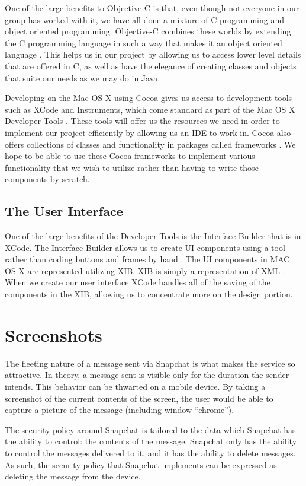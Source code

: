 \documentclass[11pt, a4paper,titlepage]{report}
\begin{document}
One of the large benefits to Objective-C is that, even though not everyone in our group has worked with it, we have all done a mixture of C programming and object oriented programming. Objective-C combines these worlds by extending the C programming language in such a way that makes it an object oriented language \cite{Hillegass}. This helps us in our project by allowing us to access lower level details that are offered in C, as well as have the elegance of creating classes and objects that suite our needs as we may do in Java.

Developing on the Mac OS X using Cocoa gives us access to development tools such as XCode and Instruments, which come standard as part of the Mac OS X Developer Tools \cite{Hillegass}. These tools will offer us the resources we need in order to implement our project  efficiently by allowing us an IDE to work in. Cocoa also offers collections of classes and functionality in packages called frameworks \cite{Hillegass}. We hope to be able to use these Cocoa frameworks to implement various functionality that we wish to utilize rather than having to write those components by scratch.

\subsection*{The User Interface}
One of the large benefits of the Developer Tools is the Interface Builder that is in XCode. The Interface Builder allows us to create UI components using a tool rather than coding buttons and frames by hand \cite{Hillegass}. The UI components in MAC OS X are represented utilizing XIB. XIB is simply a representation of XML \cite{Hillegass}. When we create our user interface XCode handles all of the saving of the components in the XIB, allowing us to concentrate more on the design portion.

\section*{Screenshots}
The fleeting nature of a message sent via Snapchat is what makes the service so attractive. In theory, a message sent is visible only for the duration the sender intends. This behavior can be thwarted on a mobile device. By taking a screenshot of the current contents of the screen, the user would be able to capture a picture of the message (including window ``chrome'').

The security policy around Snapchat is tailored to the data which Snapchat has the ability to control: the contents of the message. Snapchat only has the ability to control the messages delivered to it, and it has the ability to delete messages. As such, the security policy that Snapchat implements can be expressed as deleting the message from the device.
\end{document}
